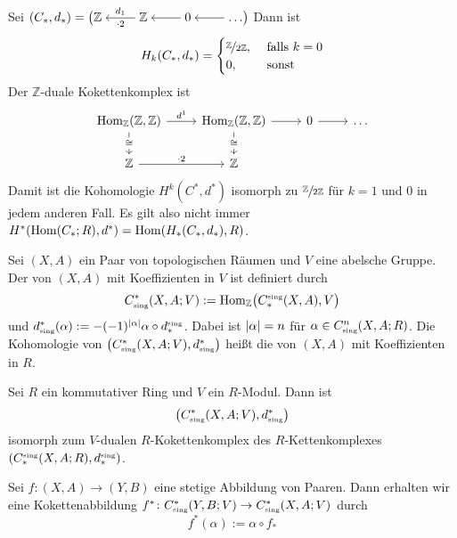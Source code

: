 \begin{beispiel}
	Sei $(C_*,d_*)= \big(\begin{tikzcd}[cramped] \mathds{Z} & \mathds{Z} \lar["\cdot 2","d_1"'] & 0 \lar & \ldots \lar \end{tikzcd}\big)$ Dann ist
	\[
		H_k(C_*,d_*) = \begin{cases}
			\nicefrac{\mathds{Z}}{2 \mathds{Z}}, &\text{ falls } k =0\\
			0 , & \text{ sonst} 
		\end{cases}
	\]
	Der $\mathds{Z}$-duale Kokettenkomplex ist
	\[
		\begin{tikzcd}
			 \Hom_{\mathds{Z}}(\mathds{Z},\mathds{Z}) \rar["d^1"] \dar["\cong" description] & \Hom_{\mathds{Z}}(\mathds{Z},\mathds{Z}) \rar \dar["\cong" description] 
			& 0 \rar & \ldots \\
			\mathds{Z} \rar["\cdot 2"] & \mathds{Z}
		\end{tikzcd}
	\]
	Damit ist die Kohomologie $H^k(C^*,d^*)$ isomorph zu $\sfrac{\mathds{Z}}{2 \mathds{Z}}$ für $k=1$ und $0$ in jedem anderen Fall.
	Es gilt also nicht immer $H^*(\Hom(C_*;R),d^*) =  \Hom \enbrace{H_*(C_*,d_*),R}$.
\end{beispiel}

\begin{definition}[{name=[singulärer Kokettenkomplex]}]
	Sei $(X,A)$ ein Paar von topologischen Räumen und $V$ eine abelsche Gruppe. Der  von $(X,A)$ mit Koeffizienten in $V$ ist definiert durch
	\[
		C^*_\sing(X,A;V) := \Hom_\mathds{Z} \enbrace[\big]{C_*^\sing(X,A),V}
	\]
	und $d^*_\sing(\alpha) := - (-1)^{\abs{\alpha}} \alpha \circ d_*^\sing$. Dabei ist $\abs{\alpha}=n$ für $\alpha \in C^n_\sing(X,A;R)$. Die 
	Kohomologie von $\enbrace*{C^*_\sing(X,A;V), d^*_\sing}$ heißt die  von $(X,A)$ mit Koeffizienten in $R$.
\end{definition}

\begin{bemerkung}
	Sei $R$ ein kommutativer Ring und $V$ ein $R$-Modul. Dann ist
	\[
		\enbrace*{C^*_\sing(X,A;V), d^*_\sing}
	\]
	isomorph zum $V$-dualen $R$-Kokettenkomplex des $R$-Kettenkomplexes $\enbrace*{C^\sing_*(X,A;R), d^\sing_*}$.
\end{bemerkung}


\begin{definition}[{name=[induzierte Abbildung]}]
	Sei $f \colon (X,A) \to (Y,B)$ eine stetige Abbildung von Paaren. Dann erhalten wir eine Kokettenabbildung $f^* \colon C^*_\sing(Y,B;V) \to C^*_\sing(X,A;V)$ durch
	\[
		f^*(\alpha) := \alpha \circ f_*
	\]
\end{definition}

